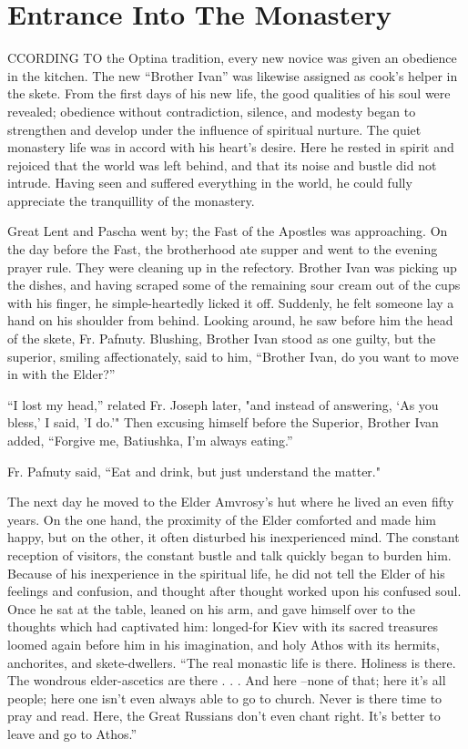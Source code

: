 \chapter{Entrance Into The Monastery}
CCORDING TO the Optina tradition, every new novice was given an obedience in the kitchen. The new “Brother Ivan” was likewise assigned as cook's helper in the skete. From the first days of his new life, the good qualities of his soul were revealed; obedience without contradiction, silence, and modesty began to strengthen and develop under the influence of spiritual nurture. The quiet monastery life was in accord with his heart's desire. Here he rested in spirit and rejoiced that the world was left behind, and that its noise and bustle did not intrude. Having seen and suffered everything in the world, he could fully appreciate the tranquillity of the monastery.

Great Lent and Pascha went by; the Fast of the Apostles was approaching. On the day before the Fast, the brotherhood ate supper and went to the evening prayer rule. They were cleaning up in the refectory. Brother Ivan was picking up the dishes, and having scraped some of the remaining sour cream out of the cups with his finger, he simple-heartedly licked it off. Suddenly, he felt someone lay a hand on his shoulder from behind. Looking around, he saw before him the head of the skete, Fr. Pafnuty. Blushing, Brother Ivan stood as one guilty, but the superior, smiling affectionately, said to him, “Brother Ivan, do you want to move in with the Elder?”

“I lost my head,” related Fr. Joseph later, "and instead of answering, ‘As you bless,' I said, 'I do.'" Then excusing himself before the Superior, Brother Ivan added, “Forgive me, Batiushka, I'm always eating.”

Fr. Pafnuty said, “Eat and drink, but just understand the matter."

The next day he moved to the Elder Amvrosy's hut where he lived an even fifty years. On the one hand, the proximity of the Elder comforted and made him happy, but on the other, it often disturbed his inexperienced mind. The constant reception of visitors, the constant bustle and talk quickly began to burden him. Because of his inexperience in the spiritual life, he did not tell the Elder of his feelings and confusion, and thought after thought worked upon his confused soul. Once he sat at the table, leaned on his arm, and gave himself over to the thoughts which had captivated him: longed-for Kiev with its sacred treasures loomed again before him in his imagination, and holy Athos with its hermits, anchorites, and skete-dwellers. “The real monastic life is there. Holiness is there. The wondrous elder-ascetics are there . . . And here --none of that; here it's all people; here one isn't even always able to go to church. Never is there time to pray and read. Here, the Great Russians don't even chant right. It's better to leave and go to Athos.”

